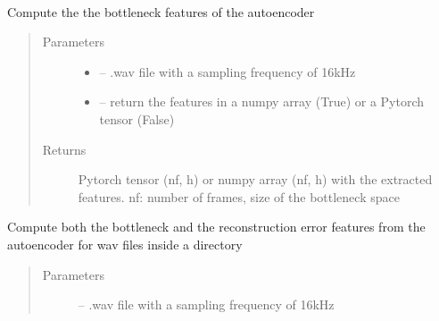 \documentclass[letterpaper,10pt,english]{sphinxmanual}
\begin{document}
\begin{fulllineitems}
\label{\detokenize{RepLearning:replearning.AEspeech}}~

\begin{fulllineitems}
\label{\detokenize{RepLearning:replearning.AEspeech.compute_bottleneck_features}}
Compute the the bottleneck features of the autoencoder
\begin{quote}\begin{description}
\item[{Parameters}] \leavevmode\begin{itemize}
\item {} 
 -- .wav file with a sampling frequency of 16kHz

\item {} 
 -- return the features in a numpy array (True) or a Pytorch tensor (False)

\end{itemize}

\item[{Returns}] \leavevmode
Pytorch tensor (nf, h) or numpy array (nf, h) with the extracted features. nf: number of frames, size of the bottleneck space

\end{description}\end{quote}

\end{fulllineitems}


\begin{fulllineitems}
\label{\detokenize{RepLearning:replearning.AEspeech.compute_dynamic_features}}
Compute both the bottleneck and the reconstruction error features from the autoencoder for wav files inside a directory
\begin{quote}\begin{description}
\item[{Parameters}] \leavevmode
{} -- .wav file with a sampling frequency of 16kHz


\end{description}
\end{quote}
\end{fulllineitems}
\end{fulllineitems}
\end{document}
